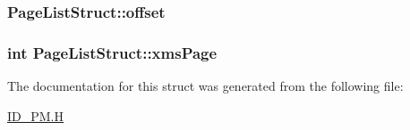 \label{structPageListStruct_a64f05551b9c34348c49f4a175b9e4072}
\hypertarget{structPageListStruct_a9b67eab88331155941372df93f50b643}{
\subsubsection[{offset}]{ {\bf PageListStruct::offset}}}
\label{structPageListStruct_a9b67eab88331155941372df93f50b643}
\hypertarget{structPageListStruct_a57b442a1b1e2e08e5607930e36697d24}{
\subsubsection[{xmsPage}]{\setlength{\rightskip}{0pt plus 5cm}int {\bf PageListStruct::xmsPage}}}
\label{structPageListStruct_a57b442a1b1e2e08e5607930e36697d24}


The documentation for this struct was generated from the following file:\begin{DoxyCompactItemize}
\item 
\hyperlink{ID__PM_8H}{ID\_\-PM.H}\end{DoxyCompactItemize}
